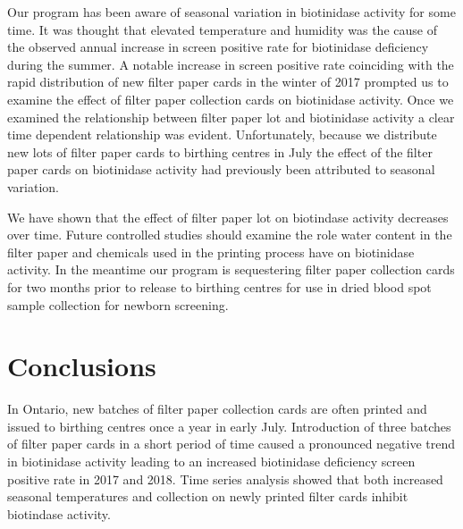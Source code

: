 \documentclass[review]{elsarticle}
\begin{document}
Our program has been aware of seasonal variation in biotinidase
activity for some time. It was thought that elevated temperature and
humidity was the cause of the observed annual increase in screen
positive rate for biotinidase deficiency during the summer. A notable
increase in screen positive rate coinciding with the rapid
distribution of new filter paper cards in the winter of 2017 prompted
us to examine the effect of filter paper collection cards on
biotinidase activity. Once we examined the relationship between filter
paper lot and biotinidase activity a clear time dependent relationship
was evident. Unfortunately, because we distribute new lots of filter
paper cards to birthing centres in July the effect of the filter paper
cards on biotinidase activity had previously been attributed to
seasonal variation.

We have shown that the effect of filter paper lot on biotindase
activity decreases over time. Future controlled studies should examine
the role water content in the filter paper and chemicals used in the
printing process have on biotinidase activity. In the meantime our
program is sequestering filter paper collection cards for two months
prior to release to birthing centres for use in dried blood spot
sample collection for newborn screening.

\section*{Conclusions}
\label{sec:org5b09a07}

In Ontario, new batches of filter paper collection cards are often
printed and issued to birthing centres once a year in early
July. Introduction of three batches of filter paper cards in a short
period of time caused a pronounced negative trend in biotinidase
activity leading to an increased biotinidase deficiency screen
positive rate in 2017 and 2018. Time series analysis showed that both
increased seasonal temperatures and collection on newly printed filter
cards inhibit biotindase activity.
\end{document}
